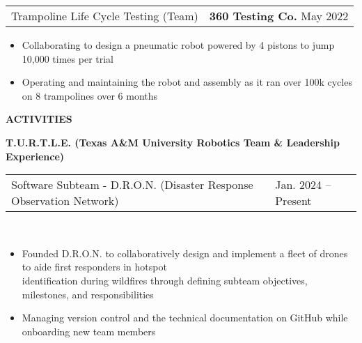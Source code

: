 \documentclass[18pt]{article}
\begin{document}
    \vspace{-0.5\baselineskip}
    \begin{tabular}{p{} p{} }
        Trampoline Life Cycle Testing (Team) 
        &
        \textbf{360 Testing Co.} \hfill May 2022
    \end{tabular}

    \vspace{-0.5\baselineskip}
    \begin{itemize}[noitemsep]
        
        \item Collaborating to design a pneumatic robot powered by 4 pistons to jump 10,000 times per trial
        \item Operating and maintaining the robot and assembly as it ran over 100k cycles on 8 trampolines over 6 months
    \end{itemize}


    \vspace{-1.25\baselineskip}
    \begin{center}
        \textbf{ACTIVITIES}
        \hrulefill
    \end{center}
    \vspace{-0.5\baselineskip}

    \textbf{T.U.R.T.L.E. (Texas A\&M University Robotics Team \& Leadership Experience)}

    \begin{tabular}{p{} p{} }
        Software Subteam - D.R.O.N. (Disaster Response Observation Network)
        &\hfill Jan. 2024 – Present
    \end{tabular}\\


    \vspace{-0.75\baselineskip}
    \begin{itemize}[noitemsep]
        \vspace{-\baselineskip}
        \item Founded D.R.O.N. to collaboratively design and implement a fleet of drones to aide first responders in hotspot\\ identification during wildfires through defining subteam objectives, milestones, and responsibilities
        \item Managing version control and the technical documentation on GitHub while onboarding new team members 
        
    \end{itemize}
\end{document}
